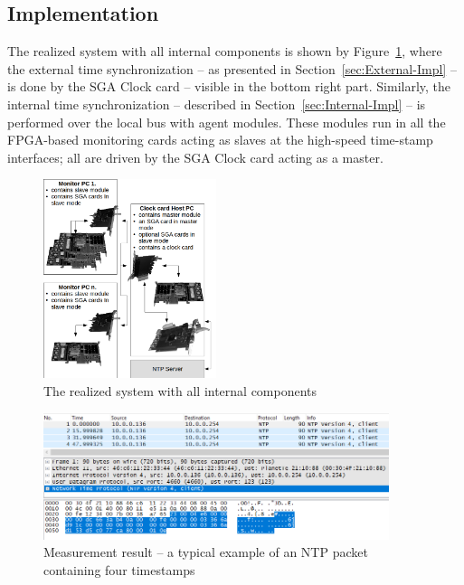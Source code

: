 \documentclass[journal]{IEEEtran}
\begin{document}
\subsection{Implementation}

The realized system with all internal components is shown by Figure~\ref{fig:realized-system}, where the external time
synchronization -- as presented in Section~\ref{sec:External-Impl} -- is done by the SGA Clock card -- visible in the
bottom right part. Similarly, the internal time synchronization -- described in Section~\ref{sec:Internal-Impl} --
is performed over the local bus with agent modules. These modules run in all the FPGA-based monitoring cards acting as slaves at the
high-speed time-stamp interfaces; all are driven by the SGA Clock card acting as a master.

\begin{figure}[H]
    \centering
    \includegraphics[width=0.45\textwidth]{figures_raw/clock_architecture.png}
    \caption{The realized system with all internal components}
    \label{fig:realized-system}
\end{figure}

\begin{figure}[!htb]
    \centering
    \includegraphics[width=0.9\textwidth]{figures_raw/pcap-NTP.png}
    \caption{Measurement result -- a typical example of an NTP packet containing four timestamps}
    \label{fig:pcap-NTP}
\end{figure}
\end{document}
